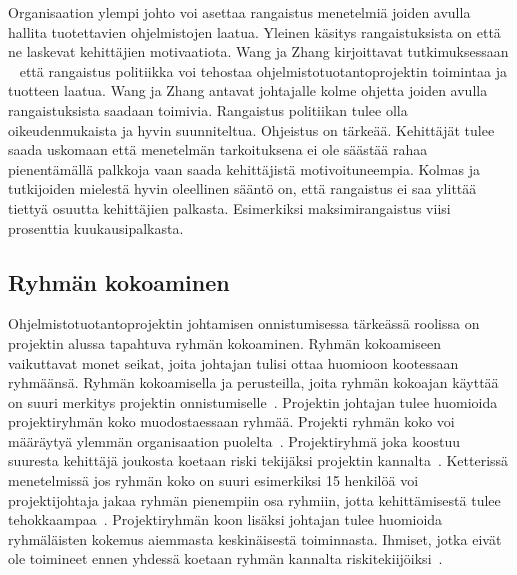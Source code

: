\documentclass[finnish]{tktltiki2}
\theoremstyle{definition}
\theoremstyle{remark}
\begin{document}
Organisaation ylempi johto voi asettaa rangaistus menetelmiä joiden avulla hallita tuotettavien ohjelmistojen laatua. Yleinen käsitys rangaistuksista on että ne laskevat kehittäjien motivaatiota. Wang ja Zhang kirjoittavat tutkimuksessaan ~\cite{Wang:2010:PPP:1810295.1810302} että rangaistus politiikka voi tehostaa ohjelmistotuotantoprojektin toimintaa ja tuotteen laatua. Wang ja Zhang antavat johtajalle kolme ohjetta joiden avulla rangaistuksista saadaan toimivia. Rangaistus politiikan tulee olla oikeudenmukaista ja hyvin suunniteltua. Ohjeistus on tärkeää. Kehittäjät tulee saada uskomaan että menetelmän tarkoituksena ei ole säästää rahaa pienentämällä palkkoja vaan saada kehittäjistä motivoituneempia. Kolmas ja tutkijoiden mielestä hyvin oleellinen sääntö on, että rangaistus ei saa ylittää tiettyä osuutta kehittäjien palkasta. Esimerkiksi maksimirangaistus viisi prosenttia kuukausipalkasta.



\subsection{Ryhmän kokoaminen}


Ohjelmistotuotantoprojektin johtamisen onnistumisessa tärkeässä roolissa on projektin alussa tapahtuva ryhmän kokoaminen. Ryhmän kokoamiseen vaikuttavat monet seikat, joita johtajan tulisi ottaa huomioon kootessaan ryhmäänsä. Ryhmän kokoamisella ja perusteilla, joita ryhmän kokoajan käyttää on suuri merkitys projektin onnistumiselle~\cite{daSilva2012}. Projektin johtajan tulee huomioida projektiryhmän koko muodostaessaan ryhmää. Projekti ryhmän koko voi määräytyä ylemmän organisaation puolelta~\cite{McLeod:2011:FAS:1978802.1978803}. Projektiryhmä joka koostuu suuresta kehittäjä joukosta koetaan riski tekijäksi projektin kannalta~\cite{McLeod:2011:FAS:1978802.1978803}. Ketterissä menetelmissä jos ryhmän koko on suuri esimerkiksi 15 henkilöä voi projektijohtaja jakaa ryhmän pienempiin osa ryhmiin, jotta kehittämisestä tulee tehokkaampaa~\cite{Augustine:2005:APM:1101779.1101781}. Projektiryhmän koon lisäksi johtajan tulee huomioida ryhmäläisten kokemus aiemmasta keskinäisestä toiminnasta. Ihmiset, jotka eivät ole toimineet ennen yhdessä koetaan ryhmän kannalta riskitekiijöiksi~\cite{McLeod:2011:FAS:1978802.1978803}.
\end{document}
